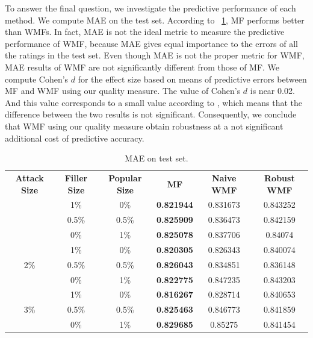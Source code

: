 \documentclass[master,english,final]{kaist-ucs}
\begin{document}
To answer the final question, we investigate the predictive performance of each method.
We compute MAE on the test set.
According to ~\ref{resultMAE}, MF performs better than WMFs.
In fact, MAE is not the ideal metric to measure the predictive performance of WMF, because MAE gives equal importance to the errors of all the ratings in the test set.
Even though MAE is not the proper metric for WMF, MAE results of WMF are not significantly different from those of MF.
We compute Cohen's $d$ \cite{EffectSize} for the effect size based on means of predictive errors between MF and WMF using our quality measure.
The value of Cohen's $d$ is near 0.02.
And this value corresponds to a small value according to \cite{EffectSize}, which means that the difference between the two results is not significant.
Consequently, we conclude that WMF using our quality measure obtain robustness at a not significant additional cost of predictive accuracy.
\begin{table}[h]
\caption{MAE on test set.}
\label{resultMAE}
\begin{center}
\begin{tabular}{|c|c|c||c|c|c|}
\hline
\textbf{Attack Size} & \textbf{Filler Size} & \textbf{Popular Size} & \textbf{MF} & \textbf{Naive WMF} & \textbf{Robust WMF}     \\ \hhline{======}
\multirow{3}{*}{1\%} & 1\%                  & 0\%                   & \textbf{0.821944}      & 0.831673       & 0.843252 \\ \cline{2-6}
                     & 0.5\%               & 0.5\%                & \textbf{0.825909}      & 0.836473       & 0.842159 \\ \cline{2-6}
                     & 0\%                  & 1\%                   & \textbf{0.825078}      & 0.837706       & 0.84074  \\ \hline
\multirow{3}{*}{2\%} & 1\%                  & 0\%                   & \textbf{0.820305}      & 0.826343       & 0.840074 \\ \cline{2-6}
                     & 0.5\%               & 0.5\%                & \textbf{0.826043}      & 0.834851       & 0.836148 \\ \cline{2-6}
                     & 0\%                  & 1\%                   & \textbf{0.822775}      & 0.847235       & 0.843203 \\ \hline
\multirow{3}{*}{3\%} & 1\%                  & 0\%                   & \textbf{0.816267}      & 0.828714       & 0.840653 \\ \cline{2-6}
                     & 0.5\%               & 0.5\%                & \textbf{0.825463}      & 0.846773       & 0.841859 \\ \cline{2-6}
                     & 0\%                  & 1\%                   & \textbf{0.829685}      & 0.85275        & 0.841454 \\ \hline
\end{tabular}
\end{center}
\end{table}
\end{document}
